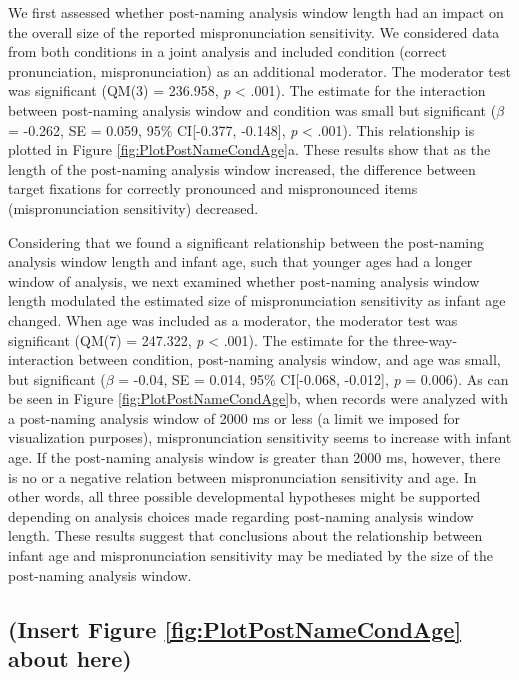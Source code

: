 \documentclass[man]{apa6}
\begin{document}
We first assessed whether post-naming analysis window length had an impact on the overall size of the reported mispronunciation sensitivity. We considered data from both conditions in a joint analysis and included condition (correct pronunciation, mispronunciation) as an additional moderator. The moderator test was significant (QM(3) = 236.958, \emph{p} \textless{} .001). The estimate for the interaction between post-naming analysis window and condition was small but significant (\(\beta\) = -0.262, SE = 0.059, 95\% CI{[}-0.377, -0.148{]}, \emph{p} \textless{} .001). This relationship is plotted in Figure \ref{fig:PlotPostNameCondAge}a. These results show that as the length of the post-naming analysis window increased, the difference between target fixations for correctly pronounced and mispronounced items (mispronunciation sensitivity) decreased.

Considering that we found a significant relationship between the post-naming analysis window length and infant age, such that younger ages had a longer window of analysis, we next examined whether post-naming analysis window length modulated the estimated size of mispronunciation sensitivity as infant age changed. When age was included as a moderator, the moderator test was significant (QM(7) = 247.322, \emph{p} \textless{} .001). The estimate for the three-way-interaction between condition, post-naming analysis window, and age was small, but significant (\(\beta\) = -0.04, SE = 0.014, 95\% CI{[}-0.068, -0.012{]}, \emph{p} = 0.006). As can be seen in Figure \ref{fig:PlotPostNameCondAge}b, when records were analyzed with a post-naming analysis window of 2000 ms or less (a limit we imposed for visualization purposes), mispronunciation sensitivity seems to increase with infant age. If the post-naming analysis window is greater than 2000 ms, however, there is no or a negative relation between mispronunciation sensitivity and age. In other words, all three possible developmental hypotheses might be supported depending on analysis choices made regarding post-naming analysis window length. These results suggest that conclusions about the relationship between infant age and mispronunciation sensitivity may be mediated by the size of the post-naming analysis window.

\hypertarget{insert-figure-reffigplotpostnamecondage-about-here}{%
\subsection{(Insert Figure \ref{fig:PlotPostNameCondAge} about here)}\label{insert-figure-reffigplotpostnamecondage-about-here}}
\end{document}

